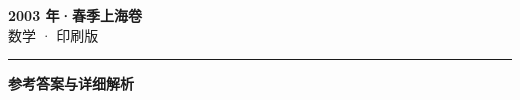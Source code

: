 \documentclass[zihao=5, a4paper]{ctexart}
\begin{document}
\begin{center}
  {\Large\bfseries 2003 年·春季上海卷}\\[4pt]
  {\large 数学 · 印刷版}
\end{center}
\medskip
{}

\par\bigskip\hrule\bigskip
{}
\begin{center}{\large\bfseries 参考答案与详细解析}\end{center}
\smallskip

\end{document}

